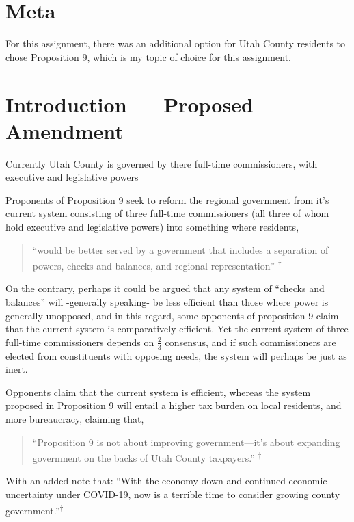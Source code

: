 
\section{Meta}

For this assignment, there was an additional option for Utah County residents to chose Proposition 9, which is my topic of choice for this assignment. 


\section{Introduction — Proposed Amendment}

Currently Utah County is governed by there full-time commissioners, with executive and legislative powers 


Proponents of Proposition 9 seek to reform the regional government from it’s current system consisting of three full-time commissioners (all three of whom hold executive and legislative powers) into something where residents,
\begin{quotation}
    ``would be better served by a government that includes a separation of powers, checks and balances, and regional representation'' \textsuperscript{†} 
\end{quotation}

On the contrary, perhaps it could be argued that any system of ``checks and balances'' will -generally speaking- be less efficient than those where power is generally unopposed, and in this regard, some opponents of proposition 9 claim that the current system is comparatively efficient. Yet the current system of three full-time commissioners depends on $\frac{2}{3}$ consensus, and if such commissioners are elected from constituents with opposing needs, the system will perhaps be just as inert. 


Opponents claim that the current system is efficient, whereas the system proposed in Proposition 9 will entail a higher tax burden on local residents, and more bureaucracy, claiming that, 
\begin{quotation}
    ``Proposition 9 is not about improving government—it’s about expanding government on the backs of Utah County taxpayers.'' \textsuperscript{†} 
\end{quotation}

With an added note that: ``With the economy down and continued economic uncertainty under COVID-19, now is a terrible time to consider growing county government.''\textsuperscript{†} 

